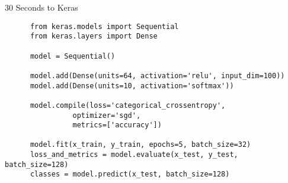 \begin{code}
  \caption{30 Seconds to Keras}
  \label{code:keras-guide}
  
  \begin{verbatim}
      from keras.models import Sequential
      from keras.layers import Dense
  
      model = Sequential()
  
      model.add(Dense(units=64, activation='relu', input_dim=100))
      model.add(Dense(units=10, activation='softmax'))
  
      model.compile(loss='categorical_crossentropy',
                optimizer='sgd',
                metrics=['accuracy'])
      
      model.fit(x_train, y_train, epochs=5, batch_size=32)
      loss_and_metrics = model.evaluate(x_test, y_test, batch_size=128)
      classes = model.predict(x_test, batch_size=128)
  \end{verbatim}
\end{code}
  